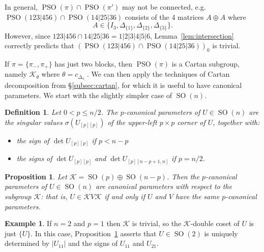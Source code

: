 \documentclass[reqno]{amsart}
\newtheorem{proposition}[theorem]{Proposition}
\newtheorem{definition}[theorem]{Definition}
\theoremstyle{definition} \newtheorem{example}[theorem]{Example}
\newcommand{\SO}{\operatorname{SO}}
\newcommand{\PSO}{\operatorname{PSO}}
\newcommand{\secsymbol}{§}
\newcommand{\K}{\mathcal{K}}
\begin{document}
In general, $\PSO(\pi) \cap \PSO(\pi')$ may not be connected, e.g.\ $\PSO(123|456) \cap \PSO(14|25|36)$ consists of the 4 matrices $A \oplus A$ where
\begin{equation*}
A \in \{I_3, \Delta_{\{1\}}, \Delta_{\{2\}}, \Delta_{\{3\}}\}.
\end{equation*}
However, since $123|456 \cap 14|25|36 = 1|2|3|4|5|6$, Lemma~\ref{lem:intersection} correctly predicts that $(\PSO(123|456) \cap \PSO(14|25|36))_0$ is trivial.

If $\pi = \{\pi_-,\pi_+\}$ has just two blocks, then $\PSO(\pi)$ is a Cartan subgroup, namely $\K_{\theta}$ where $\theta = c_{\Delta_{\pi_-}}$. We can then apply the techniques of Cartan decomposition from \secsymbol\ref{subsec:cartan}, for which it is useful to have canonical parameters. We start with the slightly simpler case of $\SO(n)$.
\begin{definition}
Let $0 < p \leq n/2$. The \emph{$p$-canonical parameters} of $U \in \SO(n)$ are the singular values $\sigma(U_{[p][p]})$ of the upper-left $p \times p$ corner of $U$, together with:
\begin{itemize}
\item the sign of $\det U_{[p][p]}$ if $p < n-p$
\item the signs of $\det U_{[p][p]}$ and $\det U_{[p][n-p+1,n]}$ if $p = n/2$.
\end{itemize}
\end{definition}

\begin{proposition} \label{prop:canonical-params}
Let $\K = \SO(p) \oplus \SO(n-p)$. Then the $p$-canonical parameters of $U \in \SO(n)$ are canonical parameters with respect to the subgroup $\K$: that is, $U \in \K V \K$ if and only if $U$ and $V$ have the same $p$-canonical parameters.
\end{proposition}

\begin{example}
If $n = 2$ and $p = 1$ then $\K$ is trivial, so the $\K$-double coset of $U$ is just $\{U\}$. In this case, Proposition~\ref{prop:canonical-params} asserts that $U \in \SO(2)$ is uniquely determined by $|U_{11}|$ and the signs of $U_{11}$ and $U_{21}$.
\end{example}
\end{document}
